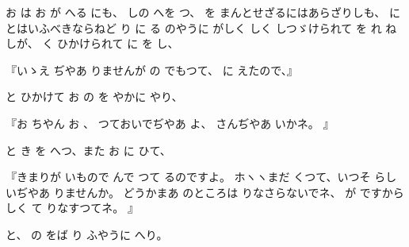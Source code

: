 
お
は
お
が
へる
にも、
しの
へを
つ、
を
まんとせざるにはあらざりしも、
に
とはいふべきならねど
り
に
る
のやうに
がしく
しく
しつゞけられて
を
れ
ね
しが、
く
ひかけられて
に
を
し、

『いゝえ
ぢやあ
りませんが
の
でもつて、
に
えたので、』

と
ひかけて
お
の
を
やかに
やり、

『お
ちやん
お
、
つておいでぢやあ
よ、
さんぢやあ
いかネ。
』

と
き
を
へつ、また
お
に
ひて、

『きまりが
いもので
んで
つて
るのですよ。
ホヽヽまだ
くつて、いつそ
らしいぢやあ
りませんか。
どうかまあ
のところは
りなさらないでネ、
が
ですから
しく
て
りなすつてネ。
』

と、
の
をば
り
ふやうに
へり。

